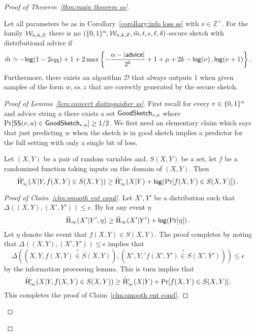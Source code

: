 \begin{proof}[Proof of Theorem~\ref{thm:main theorem ss}]
\begin{lemma}
\label{lem:convert distinguisher ss}
Let all parameters be as in Corollary~\ref{corollary:info loss ss} with $\nu \in\mathbb{Z}^+$.  For the family $\mathcal{W}_{n,k, Z}$ there is no $(\{0,1\}^n, \mathcal{W}_{n,k, Z}, \tilde{m}, t, \epsilon, \ell, \delta)$-secure sketch with distributional advice if
\[
\tilde{m}> -\mathsf{log}\!\left(1-2\epsilon_{\mathsf{SS}}\right) +1 + 2\max\left\{-\frac{\alpha-|{\mathsf{advice}}|}{2^k}+1+\mu+2k-\mathsf{log}\!\left(\nu\right), \mathsf{log}\!\left(\nu+1\right)\right\}.
\]
\noindent
Furthermore, there exists an algorithm $\mathcal{D}$ that always outputs $1$ when given samples of the form $w, ss, z$ that are correctly generated by the secure sketch. 
\end{lemma}
\begin{proof}[Proof of Lemma~\ref{lem:convert distinguisher ss}]
First recall for every $v\in \{0, 1\}^n$ and advice string $a$  there exists a set $\mathsf{GoodSketch}_{v, a}$ where $\Pr[{\mathsf{SS}}(v, a) \in\mathsf{GoodSketch}_{v,a}]\ge 1/2$. 
We first need an elementary claim which says that just predicting $w$ when the sketch is in good sketch implies a predictor for the full setting with only a single bit of loss. 
\begin{claim}
Let $(X, Y)$ be a pair of random variables and, $S(X, Y)$ be a set, let $f$ be a randomized function taking inputs on the domain of $(X, Y)$. Then \label{clm:smooth ent cond}
\[
\tilde{\mathrm{H}}_\infty^\epsilon(X|Y, f(X, Y) \in S(X, Y))\ge \tilde{\mathrm{H}}_\infty^\epsilon(X|Y) + \mathsf{log}\!\left( \Pr[f(X, Y) \in S(X, Y)]\right).
\]
\end{claim}
\begin{proof}[Proof of Claim~\ref{clm:smooth ent cond}]
Let $X', Y'$ be a distribution such that $\Delta((X, Y), (X', Y')) \le \epsilon$.  By \cite[Lemma 7.8]{fuller2020fuzzy} for any event $\eta$
\begin{align*}
\tilde{\mathrm{H}}_\infty(X'| Y', \eta) \ge \tilde{\mathrm{H}}_\infty(X' | Y') +\mathsf{log}\!\left(\Pr[\eta]\right).
\end{align*}
Let $\eta$ denote the event that $f(X, Y) \in S(X, Y)$.
The proof completes by noting that $\Delta((X, Y), (X', Y'))\le \epsilon$ implies that 
\[
\Delta((X, Y, f(X, Y) \overset{?}\in S(X, Y)), (X', Y,' f(X', Y')\overset{?}\in S(X', Y')))\le \epsilon\] by the information processing lemma. This is turn implies that 
\[
\tilde{\mathrm{H}}_\infty^\epsilon(X|Y, f(X, Y) \in S(X, Y))\ge \tilde{\mathrm{H}}_\infty^\epsilon(X|Y) +\Pr[f(X, Y) \in S(X, Y)].
\]
This completes the proof of Claim~\ref{clm:smooth ent cond}.
\end{proof}


\end{proof}
\end{proof}
